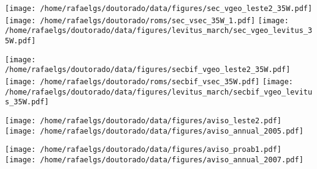 \documentclass[12pt,portuguese,a4paper,pdftex]{article}
\begin{document}
\texttt{[image: /home/rafaelgs/doutorado/data/figures/sec\_vgeo\_leste2\_35W.pdf]}
\texttt{[image: /home/rafaelgs/doutorado/roms/sec\_vsec\_35W\_1.pdf]}
\texttt{[image: /home/rafaelgs/doutorado/data/figures/levitus\_march/sec\_vgeo\_levitus\_35W.pdf]}

\texttt{[image: /home/rafaelgs/doutorado/data/figures/secbif\_vgeo\_leste2\_35W.pdf]}
\texttt{[image: /home/rafaelgs/doutorado/roms/secbif\_vsec\_35W.pdf]}
\texttt{[image: /home/rafaelgs/doutorado/data/figures/levitus\_march/secbif\_vgeo\_levitus\_35W.pdf]}

\texttt{[image: /home/rafaelgs/doutorado/data/figures/aviso\_leste2.pdf]}
\texttt{[image: /home/rafaelgs/doutorado/data/figures/aviso\_annual\_2005.pdf]}

\texttt{[image: /home/rafaelgs/doutorado/data/figures/aviso\_proab1.pdf]}
\texttt{[image: /home/rafaelgs/doutorado/data/figures/aviso\_annual\_2007.pdf]}


\end{document}
